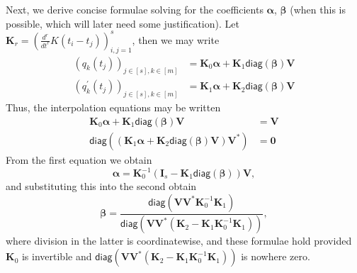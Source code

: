\documentclass[11pt]{article}
\newcommand{\diag}{\mathsf{diag}}
\newcommand{\balpha}{\bm \alpha}
\newcommand{\bbeta}{\bm \beta}
\newcommand{\bK}{\bm K}
\newcommand{\bV}{\bm V}
\begin{document}
Next, we derive concise formulae solving for the coefficients $\bm \alpha$, $\bm \beta$ (when this is possible, which will later need some justification).
Let $\bK_r = (\frac{d^r}{dt^r}K(t_i - t_j))_{i, j = 1}^s$, then we may write
\begin{align}
  (q_k(t_j))_{j \in [s], k \in [m]} &= \bK_0 \balpha + \bK_1\diag(\bbeta) \bV \\
  (q_k^\prime(t_j))_{j \in [s], k \in [m]} &= \bK_1 \balpha + \bK_2\diag(\bbeta) \bV
\end{align}
Thus, the interpolation equations may be written
\begin{align}
  \bK_0 \balpha + \bK_1\diag(\bbeta) \bV &= \bV \\
  \diag((\bK_1 \balpha + \bK_2\diag(\bbeta) \bV)\bV^*) &= \bm 0
\end{align}
From the first equation we obtain
\[ \balpha = \bK_0^{-1}(\bm I_s - \bK_1 \diag(\bbeta))\bV, \]
and substituting this into the second obtain
\[ \bbeta = \frac{\diag(\bV\bV^*\bK_0^{-1}\bK_1)}{\diag(\bV\bV^*(\bK_2 - \bK_1\bK_0^{-1}\bK_1))}, \]
where division in the latter is coordinatewise, and these formulae hold provided $\bK_0$ is invertible and $\diag(\bV\bV^*(\bK_2 - \bK_1\bK_0^{-1}\bK_1))$ is nowhere zero.
  
\clearpage



\end{document}
